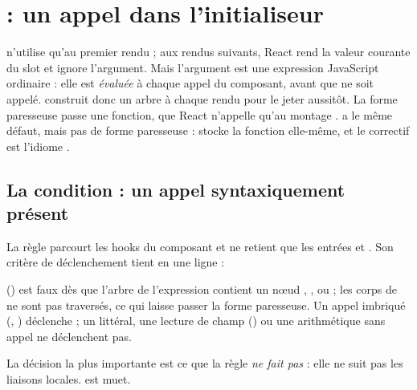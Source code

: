 \section{ : un appel dans l'initialiseur}
\label{sec:regles-etat-lazy-init}

\begin{react}
 n'utilise  qu'au premier rendu ; aux rendus suivants, React rend la valeur courante du slot et ignore l'argument. Mais l'argument est une expression JavaScript ordinaire : elle est \emph{évaluée} à chaque appel du composant, avant que  ne soit appelé.  construit donc un arbre à chaque rendu pour le jeter aussitôt. La forme paresseuse  passe une fonction, que React n'appelle qu'au montage \cite{ReactDocs}.  a le même défaut, mais pas de forme paresseuse :  stocke la fonction elle-même, et le correctif est l'idiome .
\end{react}

\subsection{La condition : un appel syntaxiquement présent}

La règle parcourt les hooks du composant et ne retient que les entrées  et . Son critère de déclenchement tient en une ligne :


 () est faux dès que l'arbre de l'expression contient un nœud , ,  ou  ; les corps de  ne sont pas traversés, ce qui laisse passer la forme paresseuse. Un appel imbriqué (, ) déclenche ; un littéral, une lecture de champ () ou une arithmétique sans appel ne déclenchent pas.

La décision la plus importante est ce que la règle \emph{ne fait pas} : elle ne suit pas les liaisons locales.  est muet.

